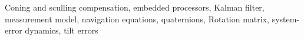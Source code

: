 \documentclass[journal]{IEEEtran}
\begin{document}
\begin{IEEEkeywords}
Coning and sculling compensation, embedded processors, Kalman filter, measurement model, navigation equations, quaternions, Rotation matrix, system-error dynamics, tilt errors
\end{IEEEkeywords}






%
\IEEEpeerreviewmaketitle
\end{document}
